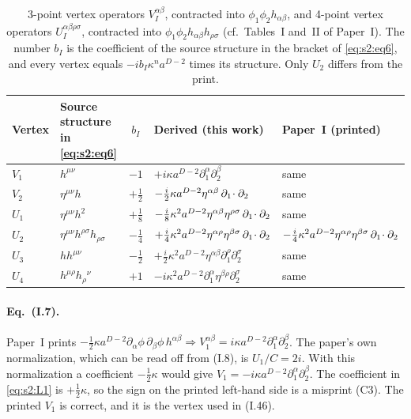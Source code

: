 \documentclass[aps,prd,onecolumn,10pt,nofootinbib,floatfix]{revtex4-2}
\newcommand{\PI}{Paper~I}
\newcommand{\eqI}[1]{(I.#1)}
\begin{document}
\begin{table}[tb]
\caption{3-point vertex operators $V_I^{\alpha\beta}$, contracted into
$\phi_1\phi_2h_{\alpha\beta}$, and 4-point vertex operators
$U_I^{\alpha\beta\rho\sigma}$, contracted into
$\phi_1\phi_2h_{\alpha\beta}h_{\rho\sigma}$ (cf.\ Tables~I and~II of \PI).
The number $b_I$ is the coefficient of the source structure in the bracket of
\eqref{eq:s2:eq6}, and every vertex equals $-ib_I\kappa^na^{D-2}$ times its
structure. Only $U_2$ differs from the print.}
\label{tab:s2:vertices}
\begin{ruledtabular}
\begin{tabular}{llcll}
Vertex & Source structure in \eqref{eq:s2:eq6} & $b_I$ & Derived (this work) & \PI{} (printed)\\
\hline
$V_1$ & $h^{\mu\nu}$ & $-1$ & $+i\kappa a^{D-2}\partial_1^\alpha\partial_2^\beta$ & same\\
$V_2$ & $\eta^{\mu\nu}h$ & $+\tfrac12$ & $-\tfrac i2\kappa a^{D-2}\eta^{\alpha\beta}\,\partial_1\!\cdot\partial_2$ & same\\
$U_1$ & $\eta^{\mu\nu}h^2$ & $+\tfrac18$ & $-\tfrac i8\kappa^2a^{D-2}\eta^{\alpha\beta}\eta^{\rho\sigma}\,\partial_1\!\cdot\partial_2$ & same\\
$U_2$ & $\eta^{\mu\nu}h^{\rho\sigma}h_{\rho\sigma}$ & $-\tfrac14$ & $+\tfrac i4\kappa^2a^{D-2}\eta^{\alpha\rho}\eta^{\beta\sigma}\,\partial_1\!\cdot\partial_2$ & $-\tfrac i4\kappa^2a^{D-2}\eta^{\alpha\rho}\eta^{\beta\sigma}\,\partial_1\!\cdot\partial_2$\\
$U_3$ & $hh^{\mu\nu}$ & $-\tfrac12$ & $+\tfrac i2\kappa^2a^{D-2}\eta^{\alpha\beta}\partial_1^\rho\partial_2^\sigma$ & same\\
$U_4$ & $h^{\mu\rho}h_\rho{}^\nu$ & $+1$ & $-i\kappa^2a^{D-2}\partial_1^\alpha\eta^{\beta\rho}\partial_2^\sigma$ & same\\
\end{tabular}
\end{ruledtabular}
\end{table}

\paragraph*{Eq.~(I.7).}
\PI{} prints
$-\tfrac12\kappa a^{D-2}\partial_\alpha\phi\,\partial_\beta\phi\,h^{\alpha\beta}\Rightarrow V_1^{\alpha\beta}=i\kappa a^{D-2}\partial_1^\alpha\partial_2^\beta$.
The paper's own normalization, which can be read off from \eqI{8}, is
$U_1/C=2i$. With this normalization a coefficient $-\tfrac12\kappa$ would
give $V_1=-i\kappa a^{D-2}\partial_1^\alpha\partial_2^\beta$. The
coefficient in \eqref{eq:s2:L1} is $+\tfrac12\kappa$, so the sign on the
printed left-hand side is a misprint (C3). The printed $V_1$ is correct, and
it is the vertex used in \eqI{46}.
\end{document}
